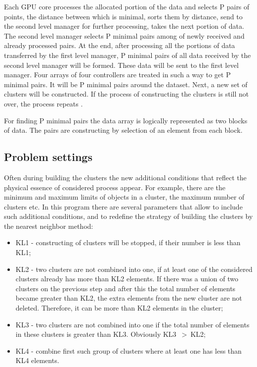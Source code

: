 \documentclass{TAACpaper}
\begin{document}
Each GPU core processes the allocated portion of the data and selects P pairs of points, the distance between which is minimal, sorts them by distance, send to the second level manager for further processing, takes the next portion of data. The second level manager selects P minimal pairs among of newly received and already processed pairs. At the end, after processing all the portions of data transferred by the first level manager, P minimal pairs of all data received by the second level manager will be formed. These data will be sent to the first level manager. Four arrays of four controllers are treated in such a way to get P minimal pairs. It will be P minimal pairs around the dataset. Next, a new set of clusters will be constructed. If the process of constructing the clusters is still not over, the process repeats \cite{prokhorenok2010VS}. 

For finding P minimal pairs the data array is logically represented as two blocks of data. The pairs are constructing by selection of an element from each block.

\subsection{Problem settings}
Often during building the clusters the new additional conditions that reflect the physical essence of considered process appear. For example, there are the minimum and maximum limits of objects in a cluster, the maximum number of clusters etc. In this program there are several parameters that allow to include such additional conditions, and to redefine the strategy of building the clusters by the nearest neighbor method: 
\begin{itemize}
 \item KL1 - constructing of clusters will be stopped, if their number is less than KL1;
 \item KL2 - two clusters are not combined into one, if at least one of the considered clusters already has more than KL2 elements. If there was a union of two clusters on the previous step and after this the total number of elements became greater than KL2, the extra elements from the new cluster are not deleted. Therefore, it can be more than KL2 elements in the cluster;
 \item  KL3 - two clusters are not combined into one if the total number of elements in these clusters is greater than KL3. Obviously KL3~$>~$KL2;
 \item KL4 - combine first such group of clusters where at least one has less than KL4 elements.
\end{itemize}
\end{document}
